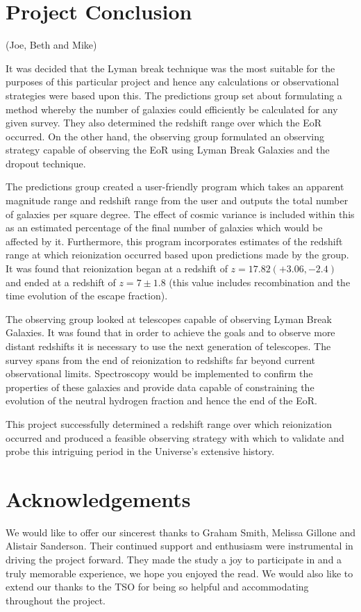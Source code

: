 \newpage
\section{Project Conclusion} %
\label{sec:project_conclusion}
(Joe, Beth and Mike)

	It was decided that the Lyman break technique was the most suitable for the purposes of this particular project and hence any calculations or observational strategies were based upon this. The predictions group set about formulating a method whereby the number of galaxies could efficiently be calculated for any given survey. They also determined the redshift range over which the EoR occurred. On the other hand, the observing group formulated an observing strategy capable of observing the EoR using Lyman Break Galaxies and the dropout technique.

	The predictions group created a user-friendly program which takes an apparent magnitude range and redshift range from the user and outputs the total number of galaxies per square degree. The effect of cosmic variance is included within this as an estimated percentage of the final number of galaxies which would be affected by it. Furthermore, this program incorporates estimates of the redshift range at which reionization occurred based upon predictions made by the group. It was found that reionization began at a redshift of $z=17.82(+3.06, -2.4)$ and ended at a redshift of $z=7\pm 1.8$ (this value includes recombination and the time evolution of the escape fraction).

	The observing group looked at telescopes capable of observing Lyman Break Galaxies. It was found that in order to achieve the goals and to observe more distant redshifts it is necessary to use the next generation of telescopes. The survey spans from the end of reionization to redshifts far beyond current observational limits. Spectroscopy would be implemented to confirm the properties of these galaxies and provide data capable of constraining the evolution of the neutral hydrogen fraction and hence the end of the EoR.

	This project successfully determined a redshift range over which reionization occurred and produced a feasible observing strategy with which to validate and probe this intriguing period in the Universe's extensive history.

\section*{Acknowledgements} %
\label{sec:acknowledgements}
	We would like to offer our sincerest thanks to Graham Smith, Melissa Gillone and Alistair Sanderson. Their continued support and enthusiasm were instrumental in driving the project forward. They made the study a joy to participate in and a truly memorable experience, we hope you enjoyed the read. We would also like to extend our thanks to the TSO for being so helpful and accommodating throughout the project.
